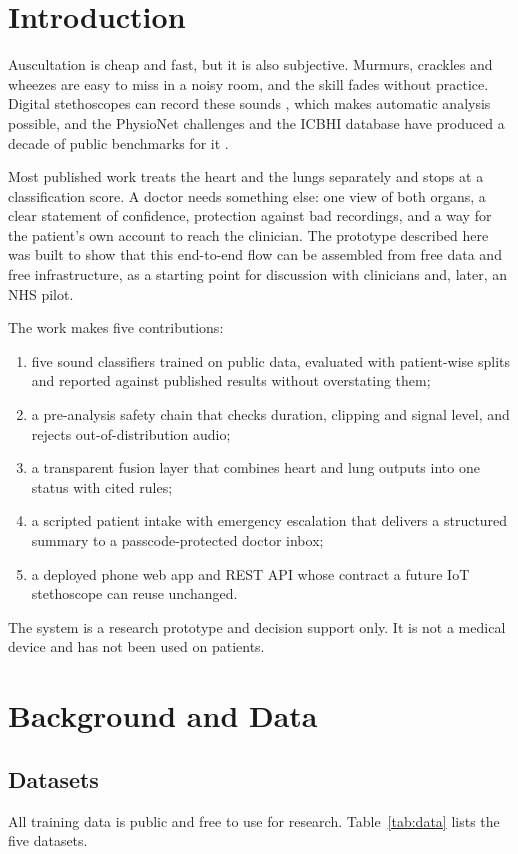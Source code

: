 \documentclass[conference]{IEEEtran}
\begin{document}
\section{Introduction}
Auscultation is cheap and fast, but it is also subjective. Murmurs, crackles and wheezes are easy to miss in a noisy room, and the skill fades without practice. Digital stethoscopes can record these sounds \cite{leng2015}, which makes automatic analysis possible, and the PhysioNet challenges and the ICBHI database have produced a decade of public benchmarks for it \cite{clifford2016,reyna2023,rocha2019}.

Most published work treats the heart and the lungs separately and stops at a classification score. A doctor needs something else: one view of both organs, a clear statement of confidence, protection against bad recordings, and a way for the patient's own account to reach the clinician. The prototype described here was built to show that this end-to-end flow can be assembled from free data and free infrastructure, as a starting point for discussion with clinicians and, later, an NHS pilot.

The work makes five contributions:
\begin{enumerate}
\item five sound classifiers trained on public data, evaluated with patient-wise splits and reported against published results without overstating them;
\item a pre-analysis safety chain that checks duration, clipping and signal level, and rejects out-of-distribution audio;
\item a transparent fusion layer that combines heart and lung outputs into one status with cited rules;
\item a scripted patient intake with emergency escalation that delivers a structured summary to a passcode-protected doctor inbox;
\item a deployed phone web app and REST API whose contract a future IoT stethoscope can reuse unchanged.
\end{enumerate}

The system is a research prototype and decision support only. It is not a medical device and has not been used on patients.

\section{Background and Data}

\subsection{Datasets}
All training data is public and free to use for research. Table~\ref{tab:data} lists the five datasets.
\end{document}
